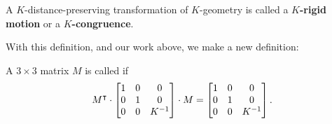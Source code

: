 \documentclass[newpage,hints,handout,noauthor,nooutcomes,12pt]{ximera}
\begin{document}





\begin{definition}
A $K$-distance-preserving transformation of $K$-geometry is called a
$K$\textbf{-rigid motion} or a $K$\textbf{-congruence}.
\end{definition}

With this definition, and our work above, we make a new definition:


\begin{definition}
A $3\times3$ matrix $M$ is called  if
\[
M^\transpose\cdot\begin{bmatrix}
1 & 0 & 0\\
0 & 1 & 0\\
0 & 0 & K^{-1}%
\end{bmatrix} \cdot M=\begin{bmatrix}
1 & 0 & 0\\
0 & 1 & 0\\
0 & 0 & K^{-1}%
\end{bmatrix}.
\]
\end{definition}
\end{document}
